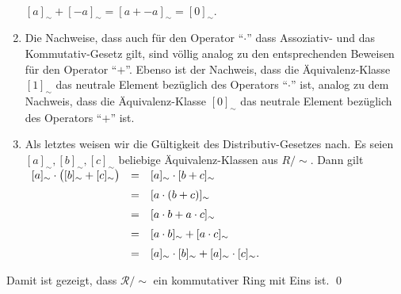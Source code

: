 \begin{enumerate}
      \\[0.2cm]
      \hspace*{1.3cm}
      $[a]_\sim + [-a]_\sim = [a + -a]_\sim = [0]_\sim$.
\item Die Nachweise, dass auch f\"{u}r den  Operator ``$\cdot$'' dass Assoziativ- und das Kommutativ-Gesetz gilt,
      sind v\"{o}llig analog zu den entsprechenden Beweisen f\"{u}r den Operator ``$+$''.
      Ebenso ist der Nachweis, dass die \"{A}quivalenz-Klasse $[1]_\sim$ das neutrale Element bez\"{u}glich des Operators 
      ``$\cdot$'' ist, analog zu dem Nachweis, dass die \"{A}quivalenz-Klasse $[0]_\sim$ das neutrale Element
      bez\"{u}glich des Operators ``$+$'' ist.
\item Als letztes weisen wir die G\"{u}ltigkeit des Distributiv-Gesetzes nach.
      Es seien  $[a]_\sim, [b]_\sim, [c]_\sim$ beliebige \"{A}quivalenz-Klassen aus $R/\!\sim$. Dann gilt
      \\[0.2cm]
      \hspace*{1.3cm}
      $
      \begin{array}[t]{lcl}
            [a]_\sim \cdot \bigl([b]_\sim + [c]_\sim\bigr) 
      & = & [a]_\sim \cdot [b + c]_\sim                        \\[0.2cm]
      & = & [a \cdot (b + c)]_\sim                             \\[0.2cm]
      & = & [a \cdot b + a \cdot c]_\sim                       \\[0.2cm]
      & = & [a \cdot b]_\sim + [a \cdot c]_\sim                \\[0.2cm]
      & = & [a]_\sim \cdot [b]_\sim + [a]_\sim \cdot [c]_\sim. 
      \end{array}
      $
\end{enumerate}
Damit ist gezeigt, dass $\mathcal{R}/\!\sim$ ein kommutativer Ring mit Eins ist. \qed


